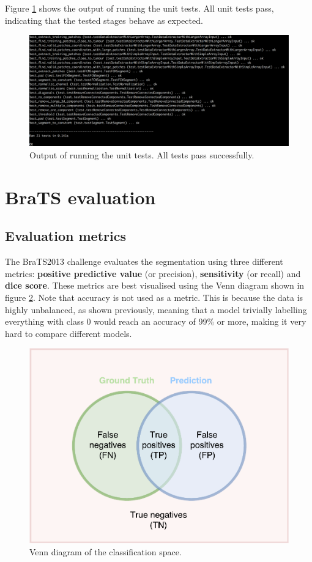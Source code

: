 \documentclass[12pt,a4paper,twoside,openright]{report}
\begin{document}
Figure \ref{fig:unit_test_output} shows the output of running the unit tests. All unit tests pass, indicating that the tested stages behave as expected.

\begin{figure}[h]
	\centering
	\includegraphics[width = \textwidth]{unit_test_output}
	\caption{Output of running the unit tests. All tests pass successfully.}
	\label{fig:unit_test_output}
\end{figure}

\section{BraTS evaluation}
\subsection{Evaluation metrics}
The BraTS2013 challenge \cite{brats-proceedings} evaluates the segmentation using three different metrics: \textbf{positive predictive value} (or precision), \textbf{sensitivity} (or recall) and \textbf{dice score}. These metrics are best visualised using the Venn diagram shown in figure \ref{fig:evaluation_venn_diagram}.  Note that accuracy is not used as a metric. This is because the data is highly unbalanced, as shown previously, meaning that a model trivially labelling everything with class 0 would reach an accuracy of 99\% or more, making it very hard to compare different models.

\begin{figure}
	\centering
	\includegraphics[scale = 0.5]{evaluation_venn_diagram}
	\caption{Venn diagram of the classification space.}
	\label{fig:evaluation_venn_diagram}
\end{figure}
\end{document}
